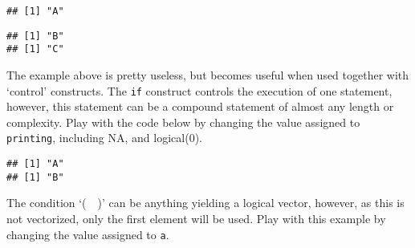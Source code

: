 \documentclass[paper=a4,10pt,div=17,headsepline,BCOR=12mm,twoside,open=right]{scrbook}\usepackage{knitr}
\begin{document}
\begin{knitrout}\footnotesize
{}\color{fgcolor}\begin{kframe}
\begin{alltt}
\hlstd{(}\hlstd{)}
\end{alltt}
\begin{verbatim}
## [1] "A"
\end{verbatim}
\begin{alltt}
\hlstd{\{}
  \hlstd{(}\hlstd{)}
  \hlstd{(}\hlstd{)}
\hlstd{\}}
\end{alltt}
\begin{verbatim}
## [1] "B"
## [1] "C"
\end{verbatim}
\end{kframe}
\end{knitrout}

The example above is pretty useless, but becomes useful when used together with `control' constructs. The \texttt{if} construct controls the execution of one statement, however, this statement can be a compound statement of almost any length or complexity. Play with the code below by changing the value assigned to \texttt{printing}, including NA, and logical(0).

\begin{knitrout}\footnotesize
{}\color{fgcolor}\begin{kframe}
\begin{alltt}
 \hlkwb{<-} 
 
  \hlstd{(}\hlstd{)}
  \hlstd{(}\hlstd{)}
\hlstd{\}}
\end{alltt}
\begin{verbatim}
## [1] "A"
## [1] "B"
\end{verbatim}
\end{kframe}
\end{knitrout}

The condition `(\ \ )' can be anything yielding a logical vector, however, as this is not vectorized, only the first element will be used. Play with this example by changing the value assigned to \texttt{a}.
\end{document}
